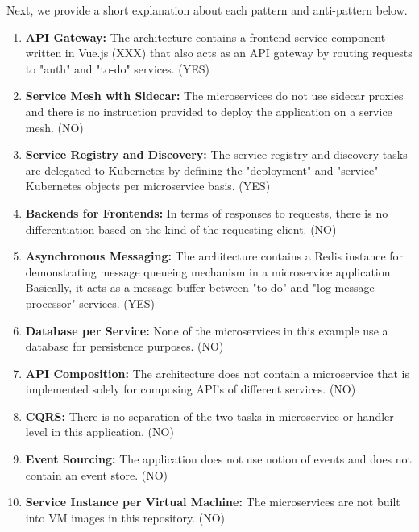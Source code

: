 \documentclass{Configuration_Files/PoliMi3i_thesis}
\begin{document}
Next, we provide a short explanation about each pattern and anti-pattern below.

\begin{enumerate}
    \item \textbf{API Gateway:} The architecture contains a frontend service component written in Vue.js (XXX) that also acts as an API gateway by routing requests to "auth" and "to-do" services. (YES)
    
    \item \textbf{Service Mesh with Sidecar:} The microservices do not use sidecar proxies and there is no instruction provided to deploy the application on a service mesh. (NO)
    
    \item \textbf{Service Registry and Discovery:} The service registry and discovery tasks are delegated to Kubernetes by defining the "deployment" and "service" Kubernetes objects per microservice basis. (YES)
    
    \item \textbf{Backends for Frontends:} In terms of responses to requests, there is no differentiation based on the kind of the requesting client. (NO)
    
    \item \textbf{Asynchronous Messaging:} The architecture contains a Redis instance for demonstrating message queueing mechanism in a microservice application.
    Basically, it acts as a message buffer between "to-do" and "log message processor" services. (YES)
    
    \item \textbf{Database per Service:} None of the microservices in this example use a database for persistence purposes. (NO)
    
    \item \textbf{API Composition:} The architecture does not contain a microservice that is implemented solely for composing API's of different services. (NO)
    
    \item \textbf{CQRS:} There is no separation of the two tasks in microservice or handler level in this application. (NO)
    
    \item \textbf{Event Sourcing:} The application does not use notion of events and does not contain an event store. (NO)
    
    \item \textbf{Service Instance per Virtual Machine:} The microservices are not built into VM images in this repository. (NO)
    

\end{enumerate}
\end{document}
